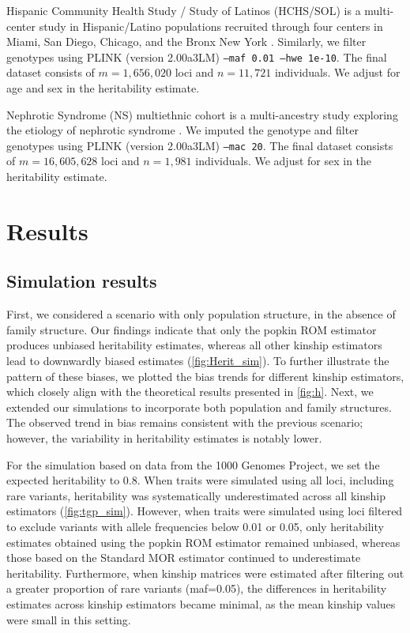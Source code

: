 \documentclass[11pt]{article}
\begin{document}
Hispanic Community Health Study / Study of Latinos (HCHS/SOL) is a multi-center study in Hispanic/Latino populations recruited through four centers in Miami, San Diego, Chicago, and the Bronx New York \citep{sorlie2010design}. Similarly, we filter genotypes using PLINK (version 2.00a3LM) \texttt{--maf 0.01 --hwe 1e-10}. The final dataset consists of $m=1,656,020 $ loci and $n=11,721 $ individuals. We adjust for age and sex in the heritability estimate.

Nephrotic Syndrome (NS) multiethnic cohort is a multi-ancestry study exploring the etiology of nephrotic syndrome \citep{cason2023genetic}. We imputed the genotype and filter genotypes using PLINK (version 2.00a3LM) \texttt{--mac 20}. The final dataset consists of $m=16,605,628  $ loci and $n=1,981  $ individuals. We adjust for sex in the heritability estimate.

\section{Results}

\subsection{Simulation results}
First, we considered a scenario with only population structure, in the absence of family structure. Our findings indicate that only the popkin ROM estimator produces unbiased heritability estimates, whereas all other kinship estimators lead to downwardly biased estimates (\cref{fig:Herit_sim}). To further illustrate the pattern of these biases, we plotted the bias trends for different kinship estimators, which closely align with the theoretical results presented in \cref{fig:h}. Next, we extended our simulations to incorporate both population and family structures. The observed trend in bias remains consistent with the previous scenario; however, the variability in heritability estimates is notably lower.

For the simulation based on data from the 1000 Genomes Project, we set the expected heritability to 0.8. When traits were simulated using all loci, including rare variants, heritability was systematically underestimated across all kinship estimators (\cref{fig:tgp_sim}). However, when traits were simulated using loci filtered to exclude variants with allele frequencies below 0.01 or 0.05, only heritability estimates obtained using the popkin ROM estimator remained unbiased, whereas those based on the Standard MOR estimator continued to underestimate heritability. Furthermore, when kinship matrices were estimated after filtering out a greater proportion of rare variants (maf=0.05), the differences in heritability estimates across kinship estimators became minimal, as the mean kinship values were small in this setting.
\end{document}

